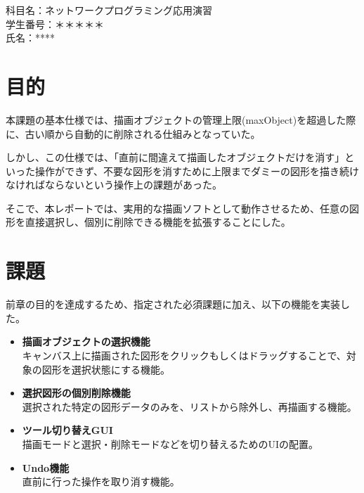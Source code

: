 \documentclass[11pt,a4paper]{ltjsarticle}
\begin{document}
\noindent
科目名：ネットワークプログラミング応用演習\\
学生番号：＊＊＊＊＊\\
氏名：****

\vspace{2em}

\section{目的}
本課題の基本仕様では、描画オブジェクトの管理上限(maxObject)を超過した際に、古い順から自動的に削除される仕組みとなっていた。

しかし、この仕様では、「直前に間違えて描画したオブジェクトだけを消す」といった操作ができず、不要な図形を消すために上限までダミーの図形を描き続けなければならないという操作上の課題があった。

そこで、本レポートでは、実用的な描画ソフトとして動作させるため、任意の図形を直接選択し、個別に削除できる機能を拡張することにした。

\section{課題}
前章の目的を達成するため、指定された必須課題に加え、以下の機能を実装した。
\begin{itemize}
    \item \textbf{描画オブジェクトの選択機能} \\
        キャンバス上に描画された図形をクリックもしくはドラッグすることで、対象の図形を選択状態にする機能。
    \item \textbf{選択図形の個別削除機能} \\
        選択された特定の図形データのみを、リストから除外し、再描画する機能。
    \item \textbf{ツール切り替えGUI} \\
        描画モードと選択・削除モードなどを切り替えるためのUIの配置。
    \item \textbf{Undo機能} \\
        直前に行った操作を取り消す機能。
\end{itemize}
\end{document}

